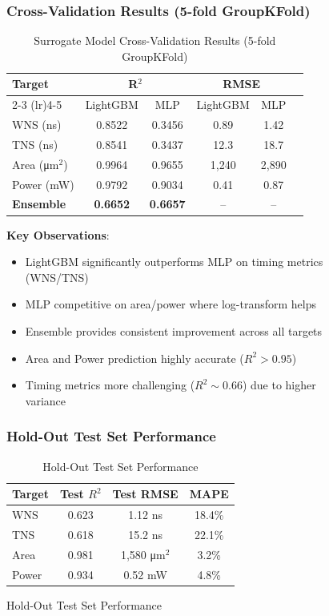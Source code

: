 \documentclass[10pt,conference]{IEEEtran}
\begin{document}
\begin{figure}[t]
\subsubsection{Cross-Validation Results (5-fold GroupKFold)}

\begin{table}[t]
\centering
\caption{Surrogate Model Cross-Validation Results (5-fold GroupKFold)}
\label{tab:surrogate_cv}
\begin{tabular}{@{}lccccc@{}}
\toprule
Target & \multicolumn{2}{c}{R$^2$} & \multicolumn{2}{c}{RMSE} \\
\cmidrule(lr){2-3} \cmidrule(lr){4-5}
& LightGBM & MLP & LightGBM & MLP \\
\midrule
WNS (ns) & 0.8522 & 0.3456 & 0.89 & 1.42 \\
TNS (ns) & 0.8541 & 0.3437 & 12.3 & 18.7 \\
Area (\si{\um}$^2$) & 0.9964 & 0.9655 & 1,240 & 2,890 \\
Power (mW) & 0.9792 & 0.9034 & 0.41 & 0.87 \\
\midrule
\textbf{Ensemble} & \textbf{0.6652} & \textbf{0.6657} & -- & -- \\
\bottomrule
\end{tabular}
\end{table}

\textbf{Key Observations}:
\begin{itemize}
    \item LightGBM significantly outperforms MLP on timing metrics (WNS/TNS)
    \item MLP competitive on area/power where log-transform helps
    \item Ensemble provides consistent improvement across all targets
    \item Area and Power prediction highly accurate ($R^2 > 0.95$)
    \item Timing metrics more challenging ($R^2 \sim 0.66$) due to higher variance
\end{itemize}

\subsubsection{Hold-Out Test Set Performance}

\begin{table}[t]
\centering
\caption{Hold-Out Test Set Performance}
\label{tab:surrogate_test}
\begin{tabular}{@{}lccc@{}}
\toprule
Target & Test $R^2$ & Test RMSE & MAPE \\
\midrule
WNS & 0.623 & 1.12 ns & 18.4\% \\
TNS & 0.618 & 15.2 ns & 22.1\% \\
Area & 0.981 & 1,580 \si{\um}$^2$ & 3.2\% \\
Power & 0.934 & 0.52 mW & 4.8\% \\
\bottomrule
\end{tabular}
\end{table}


\end{figure}
\end{document}
